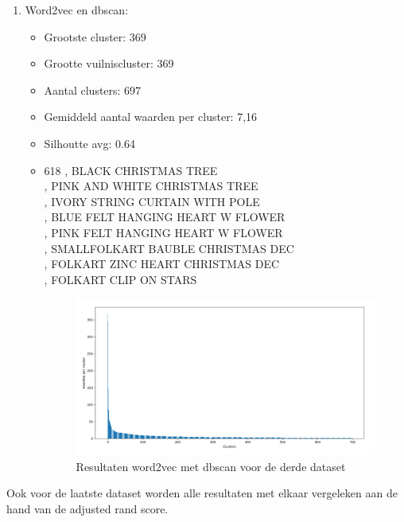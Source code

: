 \begin{enumerate}
    \item Word2vec en dbscan:
    \begin{itemize}
        \item Grootste cluster: 369
        \item Grootte vuilniscluster: 369
        \item Aantal clusters: 697
        \item Gemiddeld aantal waarden per cluster: 7,16
        \item Silhoutte avg: 0.64
        \item
        618 , BLACK CHRISTMAS TREE
        \\ , PINK AND WHITE CHRISTMAS TREE
        \\ , IVORY STRING CURTAIN WITH POLE
        \\ , BLUE FELT HANGING HEART W FLOWER
        \\ , PINK FELT HANGING HEART W FLOWER
        \\ , SMALLFOLKART BAUBLE CHRISTMAS DEC
        \\ , FOLKART ZINC HEART CHRISTMAS DEC
        \\ , FOLKART CLIP ON STARS
        \begin{figure}[h]
            \centering
            \includegraphics[width=0.7\linewidth]{../foto's/retailword2vecdbscan}
            \caption{Resultaten word2vec met dbscan voor de derde dataset}
            \label{fig:dataset3_word2vec_dbscan}
        \end{figure}
    \end{itemize}
\end{enumerate}

Ook voor de laatste dataset worden alle resultaten met elkaar vergeleken aan de hand van de adjusted rand score.

